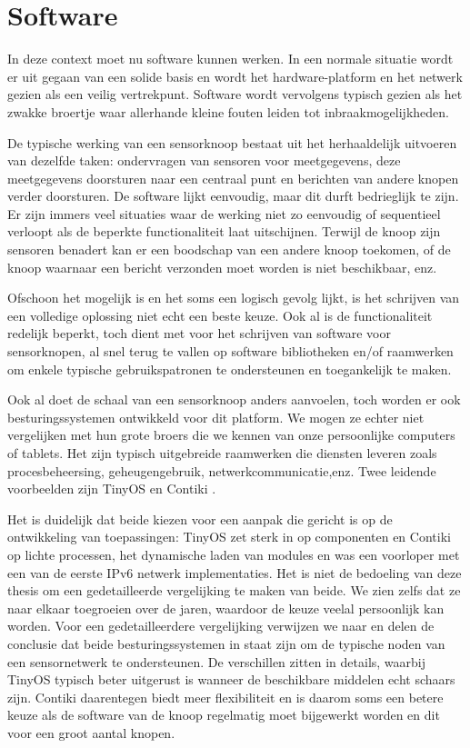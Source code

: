 \section{Software}
\label{section:problem-software}

In deze context moet nu software kunnen werken. In een normale situatie wordt
er uit gegaan van een solide basis en wordt het hardware-platform en het
netwerk gezien als een veilig vertrekpunt. Software wordt vervolgens typisch
gezien als het zwakke broertje waar allerhande kleine fouten leiden tot
inbraakmogelijkheden.

De typische werking van een sensorknoop bestaat uit het herhaaldelijk uitvoeren
van dezelfde taken: ondervragen van sensoren voor meetgegevens, deze
meetgegevens doorsturen naar een centraal punt en berichten van andere knopen
verder doorsturen. De software lijkt eenvoudig, maar dit durft bedrieglijk te
zijn. Er zijn immers veel situaties waar de werking niet zo eenvoudig of
sequentieel verloopt als de beperkte functionaliteit laat uitschijnen. Terwijl
de knoop zijn sensoren benadert kan er een boodschap van een andere knoop
toekomen, of de knoop waarnaar een bericht verzonden moet worden is niet
beschikbaar, enz.

Ofschoon het mogelijk is en het soms een logisch gevolg lijkt, is het schrijven
van een volledige oplossing niet echt een beste keuze. Ook al is de
functionaliteit redelijk beperkt, toch dient met voor het schrijven van
software voor sensorknopen, al snel terug te vallen op software bibliotheken
en/of raamwerken om enkele typische gebruikspatronen te ondersteunen en
toegankelijk te maken.

Ook al doet de schaal van een sensorknoop anders aanvoelen, toch worden er ook
besturingssystemen ontwikkeld voor dit platform. We mogen ze echter niet
vergelijken met hun grote broers die we kennen van onze persoonlijke computers
of tablets. Het zijn typisch uitgebreide raamwerken die diensten leveren zoals
procesbeheersing, geheugengebruik, netwerkcommunicatie,enz. Twee leidende
voorbeelden zijn TinyOS \citep{levis2005tinyos} en Contiki
\citep{dunkels2004contiki}.

Het is duidelijk dat beide kiezen voor een aanpak die gericht is op de
ontwikkeling van toepassingen: TinyOS zet sterk in op componenten en Contiki op
lichte processen, het dynamische laden van modules en was een voorloper met een
van de eerste IPv6 netwerk implementaties. Het is niet de bedoeling van deze
thesis om een gedetailleerde vergelijking te maken van beide. We zien zelfs dat
ze naar elkaar toegroeien over de jaren, waardoor de keuze veelal persoonlijk
kan worden. Voor een gedetailleerdere vergelijking verwijzen we naar
\citep{reusing2012comparison} en delen de conclusie dat beide
besturingssystemen in staat zijn om de typische noden van een sensornetwerk te
ondersteunen. De verschillen zitten in details, waarbij TinyOS typisch beter
uitgerust is wanneer de beschikbare middelen echt schaars zijn. Contiki
daarentegen biedt meer flexibiliteit en is daarom soms een betere keuze als de
software van de knoop regelmatig moet bijgewerkt worden en dit voor een groot
aantal knopen.


